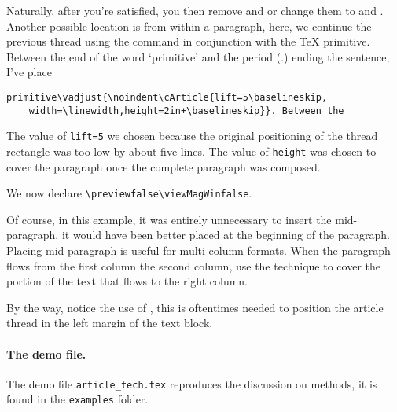 \documentclass{article}
\begin{document}
\begin{center}
\begin{minipage}{.8\linewidth}
\newtopic Naturally, after you're satisfied, you then remove
 and  or change them to
 and . Another possible location is from within
a paragraph, here, we continue the previous thread using the  command
in conjunction with the  {\TeX} primitive.
Between the end of the word `primitive' and the period (.) ending the sentence, I've place
\begin{Verbatim}[fontsize=\small]
primitive\vadjust{\noindent\cArticle{lift=5\baselineskip,
    width=\linewidth,height=2in+\baselineskip}}. Between the
\end{Verbatim}
The value of \texttt{lift=5\string\baselineskip} we chosen because the
original positioning of the thread rectangle was too low by about five lines.
The value of \texttt{height} was chosen to cover the paragraph once the
complete paragraph was composed.

\previewfalse\viewMagWinfalse
We now declare \verb|\previewfalse\viewMagWinfalse|.

\noindent{}\indent
Of course, in this example, it was entirely unnecessary to insert the
 mid-paragraph, it would have been better placed at the
beginning of the paragraph. Placing  mid-paragraph is useful for
multi-column formats. When the paragraph flows from the first column the
second column, use the  technique to cover the portion of the
text that flows to the right column.
\end{minipage}
\end{center}
By the way, notice the use of , this is
oftentimes needed to position the article thread in the left margin of the
text block.

\paragraph*{The demo file.} The demo file \texttt{article\_tech.tex}
reproduces the discussion on methods, it is found in the \texttt{examples}
folder.


\end{document}
